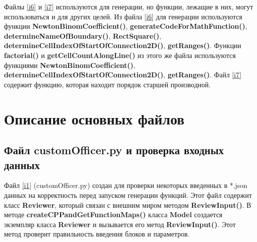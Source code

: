 \documentclass[a4paper]{article}
\begin{document}
Файлы \ref{i6} и \ref{i7} используются для генерации, но функции, лежащие в них, могут использоваться и для других целей. Из файла \ref{i6} для генерации используются функции {\bf NewtonBinomCoefficient()}, {\bf generateCodeForMathFunction()}, {\bf determineNameOfBoundary()}, {\bf RectSquare()}, {\bf determineCellIndexOfStartOfConnection2D()}, {\bf getRanges()}. Функции {\bf factorial()} и {\bf getCellCountAlongLine()} из этого же файла используются функциями {\bf NewtonBinomCoefficient()}, {\bf determineCellIndexOfStartOfConnection2D()}, {\bf getRanges()}. Файл \ref{i7} содержит функцию, которая находит порядок старшей про\-из\-вод\-ной.

\newpage
\section{\LARGE{Описание основных файлов}}
\subsection{\Large Файл customOfficer.py и проверка входных данных}
Файл \ref{i1} (customOfficer.py) создан для проверки некоторых введенных в *.json данных на корректность перед запуском генерации функций. Этот файл содержит класс {\bf Reviewer}, который связан с внешним миром методом {\bf ReviewInput()}. В методе {\bf createCPPandGetFunctionMaps()} класса {\bf Model} создается экземпляр класса {\bf Reviewer} и вызывается его метод {\bf ReviewInput()}. Этот метод проверит правильность введения бло\-ков и параметров.
\end{document}
